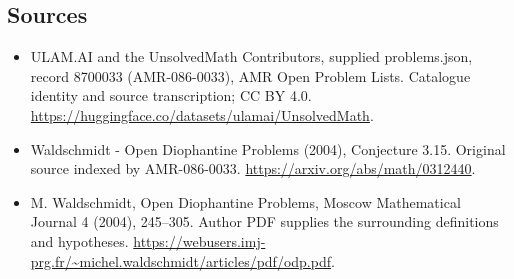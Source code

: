 \documentclass[11pt,a4paper]{article}
\begin{document}
\subsection{Sources}
\begin{itemize}
\item[S1] ULAM.AI and the UnsolvedMath Contributors, supplied problems.json, record 8700033 (AMR-086-0033), AMR Open Problem Lists. Catalogue identity and source transcription; CC BY 4.0.
\url{https://huggingface.co/datasets/ulamai/UnsolvedMath}.
\item[S2] Waldschmidt - Open Diophantine Problems (2004), Conjecture 3.15. Original source indexed by AMR-086-0033.
\url{https://arxiv.org/abs/math/0312440}.
\item[S3] M. Waldschmidt, Open Diophantine Problems, Moscow Mathematical Journal 4 (2004), 245–305. Author PDF supplies the surrounding definitions and hypotheses.
\url{https://webusers.imj-prg.fr/~michel.waldschmidt/articles/pdf/odp.pdf}.
\end{itemize}
\end{document}
